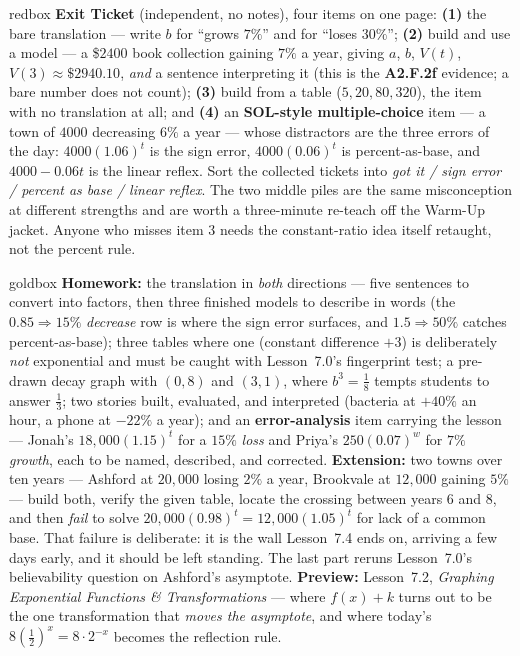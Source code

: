 \documentclass[10pt]{article}
\begin{document}
\begin{skillbox}{redbox}
\textbf{Exit Ticket} (independent, no notes), four items on one page: \textbf{(1)} the bare
translation --- write $b$ for ``grows $7\%$'' and for ``loses $30\%$''; \textbf{(2)} build and use a
model --- a \$$2400$ book collection gaining $7\%$ a year, giving $a$, $b$, $V(t)$, $V(3)\approx
\$2940.10$, \emph{and} a sentence interpreting it (this is the \textbf{A2.F.2f} evidence; a bare
number does not count); \textbf{(3)} build from a table ($5,20,80,320$), the item with no translation
at all; and \textbf{(4)} an \textbf{SOL-style multiple-choice} item --- a town of $4000$ decreasing
$6\%$ a year --- whose distractors are the three errors of the day: $4000(1.06)^{t}$ is the sign
error, $4000(0.06)^{t}$ is percent-as-base, and $4000-0.06t$ is the linear reflex. Sort the collected
tickets into \emph{got it / sign error / percent as base / linear reflex}. The two middle piles are
the same misconception at different strengths and are worth a three-minute re-teach off the Warm-Up
jacket. Anyone who misses item 3 needs the constant-ratio idea itself retaught, not the percent rule.
\end{skillbox}

\begin{skillbox}{goldbox}
\textbf{Homework:} the translation in \emph{both} directions --- five sentences to convert into
factors, then three finished models to describe in words (the $0.85 \Rightarrow 15\%$
\emph{decrease} row is where the sign error surfaces, and $1.5 \Rightarrow 50\%$ catches
percent-as-base); three tables where one (constant difference $+3$) is deliberately \emph{not}
exponential and must be caught with Lesson~7.0's fingerprint test; a pre-drawn decay graph with
$(0,8)$ and $(3,1)$, where $b^{3}=\frac18$ tempts students to answer $\frac13$; two stories built,
evaluated, and interpreted (bacteria at $+40\%$ an hour, a phone at $-22\%$ a year); and an
\textbf{error-analysis} item carrying the lesson --- Jonah's $18{,}000(1.15)^{t}$ for a $15\%$
\emph{loss} and Priya's $250(0.07)^{w}$ for $7\%$ \emph{growth}, each to be named, described, and
corrected. \textbf{Extension:} two towns over ten years --- Ashford at $20{,}000$ losing $2\%$ a
year, Brookvale at $12{,}000$ gaining $5\%$ --- build both, verify the given table, locate the
crossing between years $6$ and $8$, and then \emph{fail} to solve
$20{,}000(0.98)^{t}=12{,}000(1.05)^{t}$ for lack of a common base. That failure is deliberate: it is
the wall Lesson~7.4 ends on, arriving a few days early, and it should be left standing. The last
part reruns Lesson~7.0's believability question on Ashford's asymptote. \textbf{Preview:}
Lesson~7.2, \emph{Graphing Exponential Functions \& Transformations} --- where $f(x)+k$ turns out to
be the one transformation that \emph{moves the asymptote}, and where today's
$8\left(\frac12\right)^{x}=8\cdot2^{-x}$ becomes the reflection rule.
\end{skillbox}
\end{document}
